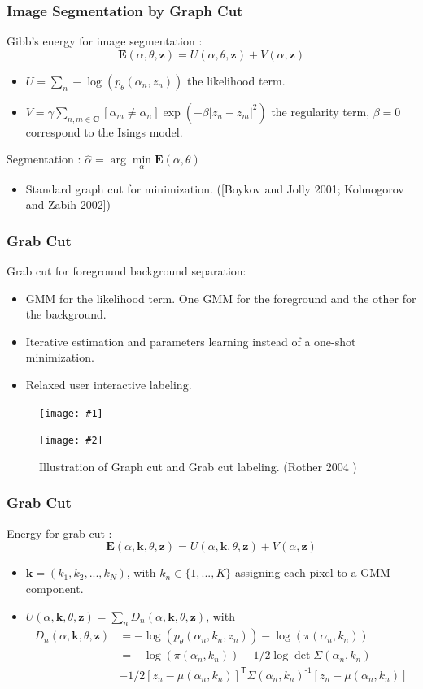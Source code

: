 \documentclass[compress]{beamer} %
\newcommand{\inv}[1]{\ensuremath{{#1}^{\text{-}1}}}
\newcommand{\tra}[1]{\ensuremath{{#1}^{\!\mathsf{T}}}}
\newcommand{\insertTwoF}[4]{
  \begin{figure}[h!]
    \centering
    \begin{minipage}{#4\linewidth}
    \texttt{[image: \#1]}
    \end{minipage}
    \begin{minipage}{#4\linewidth}
    \texttt{[image: \#2]}
    \end{minipage}
      \caption{#3}
  \end{figure}  
}
\newcommand{\bfE}{\mathbf{E}}
\newcommand{\bfz}{\mathbf{z}}
\begin{document}
 \begin{frame}
  \frametitle{Image Segmentation by Graph Cut}
  Gibb's energy for image segmentation :
  \[
  \bfE(\alpha,\theta,\bfz)=U(\alpha,\theta,\bfz)+V(\alpha,\bfz)
  \]
  \begin{itemize}
  \item $U=\sum_n -\log(p_\theta (\alpha_n,z_n))$ the likelihood term.
  \item $V=\gamma \sum_{n,m\in \mathbf{C}}[\alpha_m \neq \alpha_n] \exp(-\beta|z_n-z_m|^2)$ the regularity term, $\beta=0$ correspond to the Isings model.
  \end{itemize}

  Segmentation : $\hat \alpha= \arg\min\limits_\alpha \bfE(\alpha,\theta)$ 
  \begin{itemize}
   \item Standard graph cut for minimization. ([Boykov and Jolly 2001; Kolmogorov and Zabih 2002]) 
  \end{itemize}
 \end{frame}
 
 \begin{frame}
  \frametitle{Grab Cut}
  Grab cut for foreground background separation:
  \begin{itemize}
   \item GMM for the likelihood term. One GMM for the foreground and the other for the background.
   \item Iterative estimation and parameters learning instead of a one-shot minimization.
   \item Relaxed user interactive labeling.
  \end{itemize}
  \insertTwoF{graph_label}{grab_label}{Illustration of Graph cut and Grab cut labeling. (Rother 2004 \cite{Rother:2004})}{0.4}
 \end{frame}

 
 \begin{frame}
  \frametitle{Grab Cut}
  Energy for grab cut : 
  \[
  \bfE(\alpha,\mathbf{k},\theta,\bfz)=U(\alpha,\mathbf{k},\theta,\bfz)+V(\alpha,\bfz)
  \]

 \begin{itemize}
  \item $\mathbf{k}=(k_1,k_2,...,k_N)$, with $k_n\in \{1,...,K\}$ assigning each pixel to a GMM component.
  \item $U(\alpha,\mathbf{k},\theta,\bfz)=\sum_n D_n(\alpha,\mathbf{k},\theta,\bfz)$, with 
  \[
  \begin{split}
  D_n(\alpha,\mathbf{k},\theta,\bfz)&=-\log(p_\theta (\alpha_n,k_n,z_n)) -\log(\pi(\alpha_n,k_n)) \\
  &=-\log(\pi(\alpha_n,k_n))-1/2\log \det \Sigma(\alpha_n,k_n)\\
  &-1/2 \tra{[z_n-\mu(\alpha_n,k_n)]}\inv{\Sigma(\alpha_n,k_n)}[z_n-\mu(\alpha_n,k_n)]
  \end{split}
  \]

 \end{itemize}
 \end{frame}
 
\end{document}
